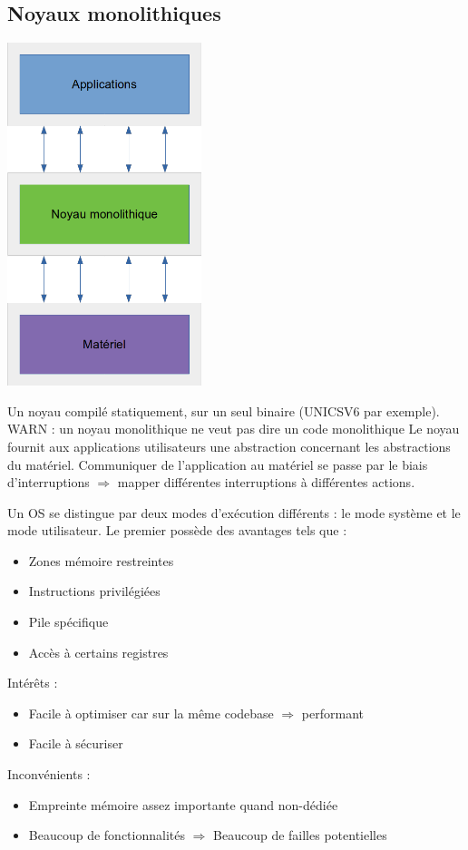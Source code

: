 \documentclass[10pt]{article}
\begin{document}
\subsection{Noyaux monolithiques}
\begin{center}
  \includegraphics[height=10cm]{./pics/cours1/cours1_monolith.png}
\end{center}
Un noyau compilé statiquement, sur un seul binaire (UNICSV6 par exemple).
\\
WARN : un noyau monolithique ne veut pas dire un code monolithique
Le noyau fournit aux applications utilisateurs une abstraction concernant les
abstractions du matériel. Communiquer de l'application au matériel se passe par
le biais d'interruptions $\Rightarrow$ mapper différentes interruptions à différentes
actions.

Un OS se distingue par deux modes d'exécution différents : le mode système et le
mode utilisateur. Le premier possède des avantages tels que :
\begin{itemize}
  \item Zones mémoire restreintes
  \item Instructions privilégiées
  \item Pile spécifique
  \item Accès à certains registres
\end{itemize}

Intérêts :
\begin{itemize}
  \item Facile à optimiser car sur la même codebase $\Rightarrow$ performant
  \item Facile à sécuriser
\end{itemize}
Inconvénients :
\begin{itemize}
  \item Empreinte mémoire assez importante quand non-dédiée
  \item Beaucoup de fonctionnalités $\Rightarrow$ Beaucoup de failles potentielles
\end{itemize}
\end{document}
